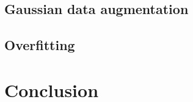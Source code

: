 \documentclass{article} \author{Simon Théorêt}
\begin{document}



\subsection{Gaussian data augmentation}
\subsection{Overfitting}

\section{Conclusion}





\end{document}

